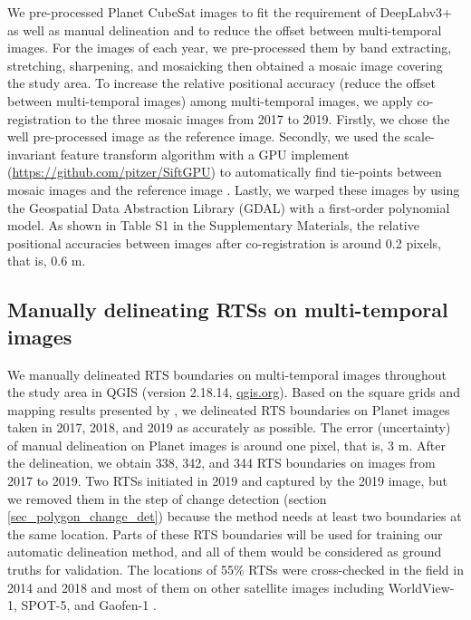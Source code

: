 \documentclass[authoryear,preprint,review,12pt]{elsarticle}
\begin{document}
We pre-processed Planet CubeSat images to fit the requirement of DeepLabv3+ as well as manual delineation and to reduce the offset between multi-temporal images. 
For the images of each year, we pre-processed them by band extracting, stretching, sharpening, and mosaicking then obtained a mosaic image covering the study area. 
To increase the relative positional accuracy (reduce the offset between multi-temporal images) among multi-temporal images, we apply co-registration to the three mosaic images from 2017 to 2019. 
Firstly, we chose the well pre-processed image \citep{huang2020using} as the reference image. 
Secondly, we used the scale-invariant feature transform algorithm \citep{lowe2004distinctive} with a GPU implement (\url{https://github.com/pitzer/SiftGPU}) to automatically find tie-points between %
 mosaic images and the reference image \citep{huang2016a}. 
Lastly, we warped these images by using the Geospatial Data Abstraction Library (GDAL) with a first-order polynomial model.
As shown in Table S1 in the Supplementary Materials, the relative positional accuracies between images after co-registration is around 0.2 pixels, that is, 0.6 m. 



\subsection{Manually delineating RTSs on multi-temporal images}
\label{sec_manu_delineating}

We manually delineated RTS boundaries on multi-temporal images throughout the study area in QGIS (version 2.18.14, \url{qgis.org}). 
Based on the square grids and mapping results presented by \cite{huang2020using}, we delineated RTS boundaries on Planet images taken in 2017, 2018, and 2019 as accurately as possible. 
The error (uncertainty) of manual delineation on Planet images is around one pixel, that is, 3 m. 
After the delineation, we obtain 338, 342, and 344 RTS boundaries on images from 2017 to 2019. 
Two RTSs initiated in 2019 and captured by the 2019 image, but we removed them in the step of change detection (section \ref{sec_polygon_change_det}) because the method needs at least two boundaries at the same location. 
Parts of these RTS boundaries will be used for training our automatic delineation method, and all of them would be considered as ground truths for validation.%
The locations of 55\% RTSs were cross-checked in the field in 2014 and 2018 and most of them on other satellite images including WorldView-1, SPOT-5, and Gaofen-1 \citep{luo2019recent}. 
%
\end{document}
